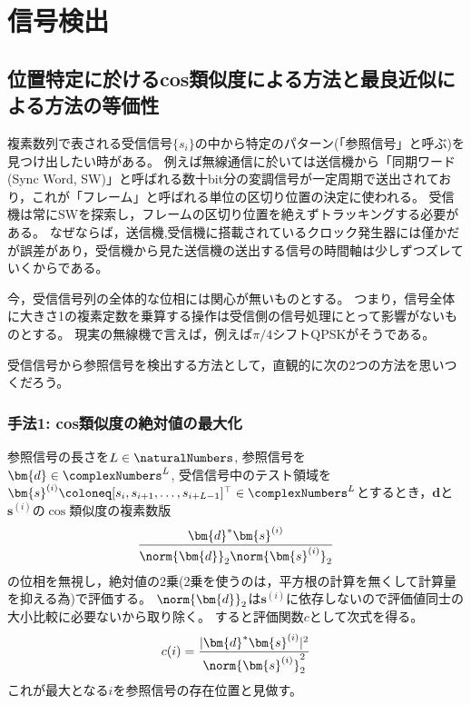 \chapter{信号検出}
    \section{位置特定に於けるcos類似度による方法と最良近似による方法の等価性}
        複素数列で表される受信信号$\{s_i\}$の中から特定のパターン(「参照信号」と呼ぶ)を見つけ出したい時がある。
        例えば無線通信に於いては送信機から「同期ワード (Sync Word, SW)」と呼ばれる数十bit分の変調信号が一定周期で送出されており，これが「フレーム」と呼ばれる単位の区切り位置の決定に使われる。
        受信機は常にSWを探索し，フレームの区切り位置を絶えずトラッキングする必要がある。
        なぜならば，送信機,受信機に搭載されているクロック発生器には僅かだが誤差があり，受信機から見た送信機の送出する信号の時間軸は少しずつズレていくからである。
        \par
        今，受信信号列の全体的な位相には関心が無いものとする。
        つまり，信号全体に大きさ1の複素定数を乗算する操作は受信側の信号処理にとって影響がないものとする。
        現実の無線機で言えば，例えば$\pi/4$シフトQPSKがそうである。
        \par
        受信信号から参照信号を検出する方法として，直観的に次の2つの方法を思いつくだろう。
        \subsection{手法1: cos類似度の絶対値の最大化}
            \label{手法1: cos類似度の絶対値の最大化}
            参照信号の長さを$L\in\naturalNumbers$, 参照信号を$\bm{d} \in \complexNumbers^L$, 受信信号中のテスト領域を$\bm{s}^{(i)} \coloneq [s_i,s_{i+1},\dots,s_{i+L-1}]^\top \in \complexNumbers^L$とするとき，$\bm{d}$と$\bm{s}^{(i)}$の$\cos$類似度の複素数版
            \[ \frac{\bm{d}^*\bm{s}^{(i)}}{\norm{\bm{d}}_2\norm{\bm{s}^{(i)}}_2} \]
            の位相を無視し，絶対値の2乗(2乗を使うのは，平方根の計算を無くして計算量を抑える為)で評価する。
            $\norm{\bm{d}}_2$は$\bm{s}^{(i)}$に依存しないので評価値同士の大小比較に必要ないから取り除く。
            すると評価関数$c$として次式を得る。
            \[ c(i) = \frac{|\bm{d}^*\bm{s}^{(i)}|^2}{\norm{\bm{s}^{(i)}}_2^2} \]
            これが最大となる$i$を参照信号の存在位置と見做す。
